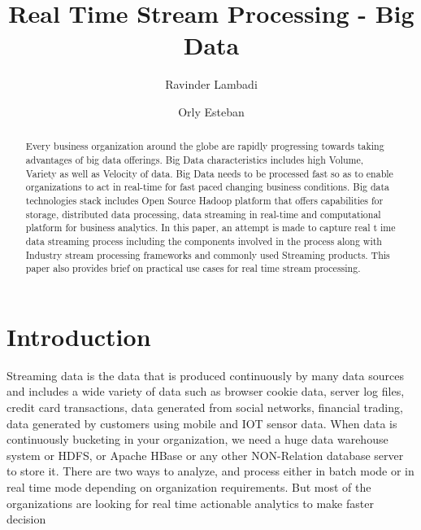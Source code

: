 
\title{Real Time Stream Processing - Big Data}

\author{Ravinder Lambadi}


\author{Orly Esteban}


\begin{abstract}
Every business organization around the globe are rapidly progressing 
towards taking advantages of big data offerings. 
Big Data characteristics includes high Volume, Variety as well as Velocity of data.  
Big Data needs to be processed fast 
so as to enable organizations to act in real-time for fast paced changing business conditions. 
Big data technologies stack includes 
Open Source Hadoop platform that offers capabilities for storage, distributed data processing, 
data streaming in real-time and computational 
platform for business analytics.  In this paper, an attempt is made to capture real t
ime data streaming process including the components involved in the process along with Industry stream 
processing frameworks and commonly used Streaming products. 
This paper also provides brief on practical use cases for real time stream processing.

\end{abstract}


\maketitle

\section{Introduction}

Streaming data is the data that is produced continuously by many data sources 
and includes a wide variety of data such as browser cookie data,
server log files, credit card transactions, data generated from social networks, 
financial trading, data generated by customers using mobile and IOT sensor data.  
When data is continuously bucketing in your organization, we need a huge data warehouse system or HDFS, 
or Apache HBase or any other NON-Relation database server to store it. 
There are two ways to analyze, and process either in batch mode or in 
real time mode depending on organization requirements. 
But most of the organizations are looking for real time actionable analytics to make faster decision
 
